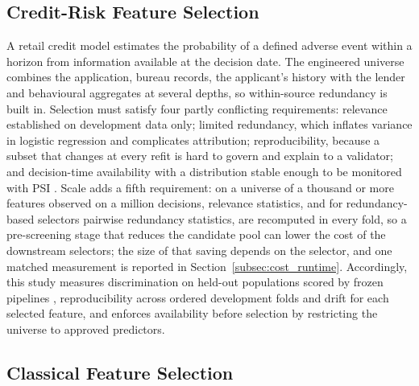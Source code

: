 \documentclass[final,5p,twocolumn]{elsarticle}
\begin{document}
\subsection{Credit-Risk Feature Selection}
\label{subsec:credit_risk_fs}

A retail credit model estimates the probability of a defined adverse event within a horizon from information available at the decision date. The engineered universe combines the application, bureau records, the applicant's history with the lender and behavioural aggregates at several depths, so within-source redundancy is built in. Selection must satisfy four partly conflicting requirements: relevance established on development data only; limited redundancy, which inflates variance in logistic regression and complicates attribution; reproducibility, because a subset that changes at every refit is hard to govern and explain to a validator; and decision-time availability with a distribution stable enough to be monitored with PSI \cite{siddiqi2006,thomas2002,yurdakul2020}. Scale adds a fifth requirement: on a universe of a thousand or more features observed on a million decisions, relevance statistics, and for redundancy-based selectors pairwise redundancy statistics, are recomputed in every fold, so a pre-screening stage that reduces the candidate pool can lower the cost of the downstream selectors; the size of that saving depends on the selector, and one matched measurement is reported in Section~\ref{subsec:cost_runtime}. Accordingly, this study measures discrimination on held-out populations scored by frozen pipelines \cite{bergmeir2012}, reproducibility across ordered development folds and drift for each selected feature, and enforces availability before selection by restricting the universe to approved predictors.

\subsection{Classical Feature Selection}
\label{subsec:classical_fs_background}
\end{document}
